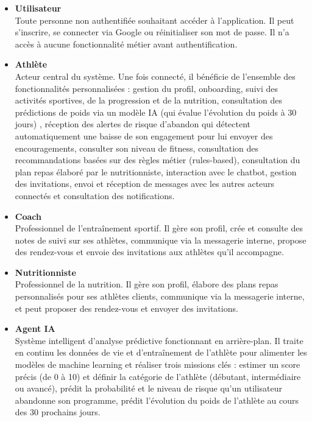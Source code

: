 ﻿\documentclass[a4paper,12pt]{report}
\begin{document}
\begin{itemize}
    \item \textbf{Utilisateur} \\
      Toute personne non authentifiée souhaitant accéder à l'application. 
    Il peut s'inscrire, se connecter via Google ou réinitialiser son mot de passe. 
    Il n'a accès à aucune fonctionnalité métier avant authentification.

    \item \textbf{Athlète}  \\
     Acteur central du système. Une fois connecté, il bénéficie de l’ensemble des fonctionnalités personnalisées :
     gestion du profil, onboarding, suivi des activités sportives, de la progression et de la nutrition,  consultation des prédictions de poids via un modèle IA (qui évalue l'évolution du poids à 30 jours) ,  réception des alertes de risque d'abandon qui détectent automatiquement une baisse de son engagement pour lui envoyer des encouragements, 
     consulter son niveau de fitness, 
     consultation des recommandations basées sur des règles métier (rules-based), consultation du plan repas élaboré par le nutritionniste,
      interaction avec le chatbot, gestion des invitations, envoi et réception de messages avec les autres acteurs connectés et consultation des notifications.

    \item \textbf{Coach} \\
    Professionnel de l'entraînement sportif. Il gère son profil, 
    crée et consulte des notes de suivi sur ses athlètes, communique via la messagerie interne, 
    propose des rendez-vous et envoie des invitations aux athlètes qu'il accompagne.

    \item \textbf{Nutritionniste} \\
    Professionnel de la nutrition. Il gère son profil, 
    élabore des plans repas personnalisés pour ses athlètes clients, communique via la 
    messagerie interne, et peut proposer des rendez-vous et envoyer des invitations.
    \item \textbf{Agent IA} \\
Système intelligent d'analyse prédictive fonctionnant en arrière-plan. Il traite en continu les données de vie et d'entraînement de l'athlète pour alimenter les modèles de machine learning et réaliser trois missions clés :
estimer un score précis (de 0 à 10) et définir la catégorie de l'athlète (débutant, intermédiaire ou avancé), prédit la probabilité et le niveau de risque qu'un utilisateur abandonne son programme, prédit l’évolution du poids de l’athlète au cours des 30 prochains jours.
   
\end{itemize}
\end{document}
